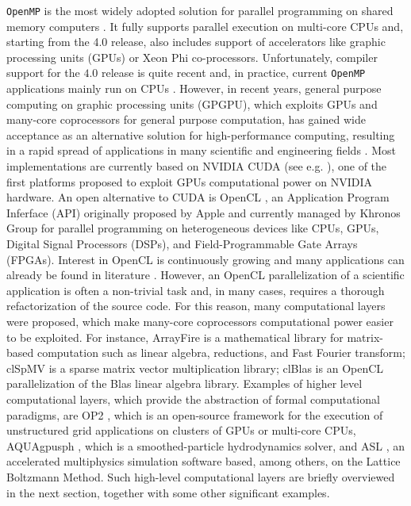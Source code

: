 \texttt{OpenMP} is the  most widely adopted solution for parallel programming on shared
  memory computers \cite{Chapman:2007:UOP:1370966}. It fully supports
  parallel execution on multi-core CPUs and, starting from the 4.0
  release, also includes support of accelerators like graphic
  processing units (GPUs) or Xeon Phi co-processors. Unfortunately,
  compiler support for the $4.0$ release is quite recent and, in
  practice, current \texttt{OpenMP} applications mainly run on CPUs
  \cite{Oliverio2011271, Amritkar2014501, pop:hal-00786675}. However,
  in recent years, general purpose computing on graphic processing
  units (GPGPU), which exploits GPUs and many-core coprocessors for
  general purpose computation, has gained wide acceptance as an
  alternative solution for high-performance computing, resulting in a
  rapid spread of applications in many scientific and engineering
  fields \cite{Owens200780}. Most implementations are currently based
  on NVIDIA CUDA (see e.g. \cite{Blecic2013, DAmbrosio2013630,
    DiGregorio20131183, DAmbrosio201230}), one of the first platforms
  proposed to exploit GPUs computational power on NVIDIA hardware. An
  open alternative to CUDA is OpenCL \cite{Stone201066}, an
  Application Program Inferface (API) originally proposed by Apple and
  currently managed by Khronos Group for parallel programming on
  heterogeneous devices like CPUs, GPUs, Digital Signal Processors
  (DSPs), and Field-Programmable Gate Arrays (FPGAs). Interest in
  OpenCL is continuously growing and many applications can already be
  found in literature \cite{Macri2015328, Bedorf20122825, Du2012391,
    Brown2011898}. However, an OpenCL parallelization of a scientific
  application is often a non-trivial task and, in many cases, requires
  a thorough refactorization of the source code. For this reason, many
  computational layers were proposed, which make many-core
  coprocessors computational power easier to be exploited. For
  instance, ArrayFire \cite{Malcolm2012} is a mathematical library for
  matrix-based computation such as linear algebra, reductions, and
  Fast Fourier transform; clSpMV \cite{Su2012353} is a sparse matrix
  vector multiplication library; clBlas \cite{clBlas-2016} is an
  OpenCL parallelization of the Blas linear algebra library. Examples
  of higher level computational layers, which provide the abstraction
  of formal computational paradigms, are OP2 \cite{Giles20131451},
  which is an open-source framework for the execution of unstructured
  grid applications on clusters of GPUs or multi-core CPUs, AQUAgpusph
  \cite{Cercos-Pita2015295}, which is a smoothed-particle
  hydrodynamics solver, and ASL \cite{asl}, an accelerated
  multiphysics simulation software based, among others, on the Lattice
  Boltzmann Method. Such high-level computational layers are briefly
  overviewed in the next section, together with some other significant
  examples.

